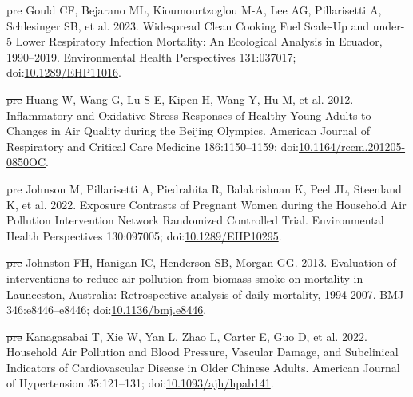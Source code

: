 \documentclass[
  letterpaper,
  DIV=11,
  numbers=noendperiod]{scrartcl}
\newlength{\cslhangindent}
\newenvironment{CSLReferences}[2] %
 {\begin{list}{}{%
  \setlength{\itemindent}{0pt} %
  \setlength{\leftmargin}{0pt} %
  \setlength{\parsep}{0pt} %
  \ifodd #1
   \setlength{\leftmargin}{\cslhangindent} %
   \setlength{\itemindent}{-1\cslhangindent} %
  \fi
  \setlength{\itemsep}{#2\baselineskip}}} %
 {\end{list}} %
\providecommand{\DIFdeltex}[1]{{\protect\color{red}\sout{#1}}}                      %
\providecommand{\DIFaddbegin}{} %
\providecommand{\DIFaddend}{} %
\providecommand{\DIFdelbegin}{} %
\providecommand{\DIFdelend}{} %
\providecommand{\DIFdel}[1]{\texorpdfstring{\DIFdeltex{#1}}{}} %
\newcommand{\DIFscaledelfig}{0.5}
\newlength{\DIFdelgraphicswidth} %
\newlength{\DIFdelgraphicsheight} %
\newcommand{\DIFaddincludegraphics}[2][]{{\color{blue}\fbox{\DIFOincludegraphics[#1]{#2}}}} %
\newcommand{\DIFdelincludegraphics}[2][]{%
\sbox{\DIFdelgraphicsbox}{\DIFOincludegraphics[#1]{#2}}%
\settoboxwidth{\DIFdelgraphicswidth}{\DIFdelgraphicsbox} %
\settoboxtotalheight{\DIFdelgraphicsheight}{\DIFdelgraphicsbox} %
\scalebox{\DIFscaledelfig}{%
\parbox[b]{\DIFdelgraphicswidth}{\usebox{\DIFdelgraphicsbox}\\[-\baselineskip] \rule{\DIFdelgraphicswidth}{0em}}\llap{\resizebox{\DIFdelgraphicswidth}{\DIFdelgraphicsheight}{%
\setlength{\unitlength}{\DIFdelgraphicswidth}%
\begin{picture}(1,1)%
\thicklines\linethickness{2pt} %
{\color[rgb]{1,0,0}\put(0,0){\framebox(1,1){}}}%
{\color[rgb]{1,0,0}\put(0,0){\line( 1,1){1}}}%
{\color[rgb]{1,0,0}\put(0,1){\line(1,-1){1}}}%
\end{picture}%
}\hspace*{3pt}}} %
} %
\DeclareRobustCommand{\DIFaddbegin}{\DIFOaddbegin \let\includegraphics\DIFaddincludegraphics} %
\DeclareRobustCommand{\DIFaddend}{\DIFOaddend \let\includegraphics\DIFOincludegraphics} %
\DeclareRobustCommand{\DIFdelbegin}{\DIFOdelbegin \let\includegraphics\DIFdelincludegraphics} %
\DeclareRobustCommand{\DIFdelend}{\DIFOaddend \let\includegraphics\DIFOincludegraphics} %
\begin{document}
\begin{CSLReferences}{1}{1}
\DIFdelbegin %
\DIFdel{pre}%
\DIFdelend \DIFaddbegin {}
\DIFaddend Gould CF, Bejarano ML, Kioumourtzoglou M-A, Lee AG, Pillarisetti A,
Schlesinger SB, et al. 2023. Widespread {Clean Cooking Fuel Scale-Up}
and under-5 {Lower Respiratory Infection Mortality}: {An Ecological
Analysis} in {Ecuador}, 1990--2019. Environmental Health Perspectives
131:037017;
doi:\href{https://doi.org/10.1289/EHP11016}{10.1289/EHP11016}.

\DIFdelbegin %
\DIFdel{pre}%
\DIFdelend \DIFaddbegin {}
\DIFaddend Huang W, Wang G, Lu S-E, Kipen H, Wang Y, Hu M, et al. 2012.
Inflammatory and {Oxidative Stress Responses} of {Healthy Young Adults}
to {Changes} in {Air Quality} during the {Beijing Olympics}. American
Journal of Respiratory and Critical Care Medicine 186:1150--1159;
doi:\href{https://doi.org/10.1164/rccm.201205-0850OC}{10.1164/rccm.201205-0850OC}.

\DIFdelbegin %
\DIFdel{pre}%
\DIFdelend \DIFaddbegin {}
\DIFaddend Johnson M, Pillarisetti A, Piedrahita R, Balakrishnan K, Peel JL,
Steenland K, et al. 2022. Exposure {Contrasts} of {Pregnant Women}
during the {Household Air Pollution Intervention Network Randomized
Controlled Trial}. Environmental Health Perspectives 130:097005;
doi:\href{https://doi.org/10.1289/EHP10295}{10.1289/EHP10295}.

\DIFdelbegin %
\DIFdel{pre}%
\DIFdelend \DIFaddbegin {}
\DIFaddend Johnston FH, Hanigan IC, Henderson SB, Morgan GG. 2013. Evaluation of
interventions to reduce air pollution from biomass smoke on mortality in
{Launceston}, {Australia}: Retrospective analysis of daily mortality,
1994-2007. BMJ 346:e8446--e8446;
doi:\href{https://doi.org/10.1136/bmj.e8446}{10.1136/bmj.e8446}.

\DIFdelbegin %
\DIFdel{pre}%
\DIFdelend \DIFaddbegin {}
\DIFaddend Kanagasabai T, Xie W, Yan L, Zhao L, Carter E, Guo D, et al. 2022.
Household {Air Pollution} and {Blood Pressure}, {Vascular Damage}, and
{Subclinical Indicators} of {Cardiovascular Disease} in {Older Chinese
Adults}. American Journal of Hypertension 35:121--131;
doi:\href{https://doi.org/10.1093/ajh/hpab141}{10.1093/ajh/hpab141}.


\end{CSLReferences}
\end{document}
